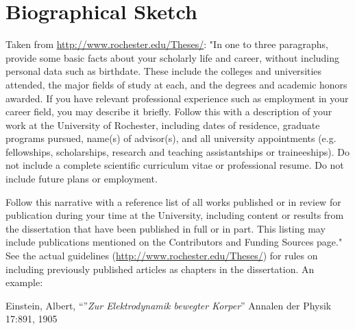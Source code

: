 \documentclass[\main/master.tex]{subfiles}
\begin{document}
\chapter*{Biographical Sketch}
\hspace{5 mm} Taken from \url{http://www.rochester.edu/Theses/}: "In one to three paragraphs, provide some basic facts about your scholarly life and career, without including personal data such as birthdate. These include the colleges and universities attended, the major fields of study at each, and the degrees and academic honors awarded. If you have relevant professional experience such as employment in your career field, you may describe it briefly. Follow this with a description of your work at the University of Rochester, including dates of residence, graduate programs pursued, name(s) of advisor(s), and all university appointments (e.g. fellowships, scholarships, research and teaching assistantships or traineeships). Do not include a complete scientific curriculum vitae or professional resume. Do not include future plans or employment. \par
Follow this narrative with a reference list of all works published or in review for publication during your
time at the University, including content or results from the dissertation that have been published in full or in
part. This listing may include publications mentioned on the Contributors and Funding Sources page." See the actual guidelines (\url{http://www.rochester.edu/Theses/}) for rules on including previously published articles as chapters in the dissertation. \newline 
An example: \par
[1] Einstein, Albert, ``''\emph{Zur Elektrodynamik bewegter Korper}'' Annalen der Physik 17:891, 1905 \newline
\end{document}
